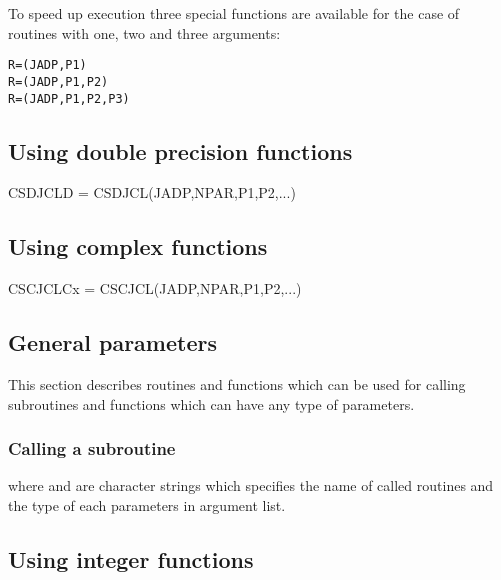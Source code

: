 To speed up execution three special functions are available
for the case of routines with one, two and three arguments:

\begin{alltt}
    R = (JADP,P1)
    R = (JADP,P1,P2)
    R = (JADP,P1,P2,P3)
\end{alltt}

\subsection*{Using double precision \COMIS{} functions}
 
%
        {CSDJCL}{D = CSDJCL(JADP,NPAR,P1,P2,...)}

\subsection*{Using complex \COMIS{} functions}
 
%
        {CSCJCL}{Cx = CSCJCL(JADP,NPAR,P1,P2,...)}

\subsection*{General parameters}

This section describes routines and functions which can be used
for calling \COMIS{} subroutines and functions which can have
any type of parameters.

\subsubsection*{Calling a \COMIS{} subroutine}
 
 
where  and  are character strings which specifies
the name of called \COMIS{} routines and the type of each
parameters in argument list.

\newpage %

\subsection*{Using integer \COMIS{} functions}
 
